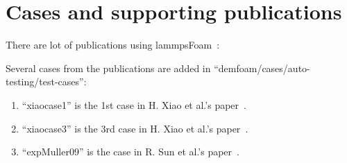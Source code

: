 \documentclass[11pt]{article}
\begin{document}
\section{Cases and supporting publications}

There are lot of publications using
lammpsFoam~\cite{sun09,xiao-cicp,gupta11a,gupta11b,gupta11b,gxs11a,gupta13a,gupta12,part1,part2}:

Several cases from the publications are added in ``demfoam/cases/auto-testing/test-cases'':
\begin{enumerate}
    \item ``xiaocase1'' is the 1st case in H. Xiao et al.'s paper~\cite{xiao-cicp}.
    \item ``xiaocase3'' is the 3rd case in H. Xiao et al.'s paper~\cite{xiao-cicp}.
    \item ``expMuller09'' is the case in R. Sun et al.'s paper~\cite{part1,part2}.
\end{enumerate}



\end{document}
